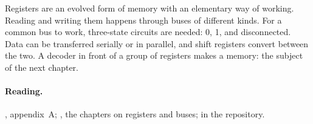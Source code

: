Registers are an evolved form of memory with an elementary way of working.
Reading and writing them happens through buses of different kinds. For a
common bus to work, three-state circuits are needed: 0, 1, and disconnected.
Data can be transferred serially or in parallel, and shift registers convert
between the two. A decoder in front of a group of registers makes a memory:
the subject of the next chapter.

\paragraph{Reading.} \citet{patterson2020}, appendix~A; \citet{bucci2017},
the chapters on registers and buses;  in the
\prg repository.
